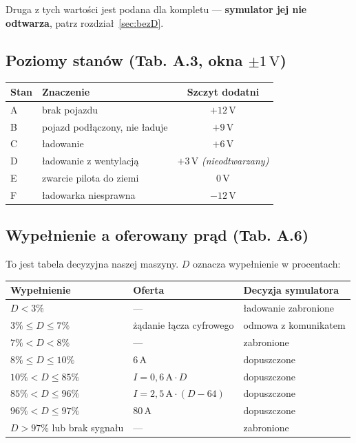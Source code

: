 \documentclass[a4paper,11pt]{article}
\newcommand{\volt}{\,\mathrm{V}}
\newcommand{\amp}{\,\mathrm{A}}
\begin{document}
Druga z tych wartości jest podana dla kompletu --- \textbf{symulator jej nie odtwarza},
patrz rozdział~\ref{sec:bezD}.

\subsection{Poziomy stanów (Tab. A.3, okna \texorpdfstring{$\pm 1\volt$}{+/-1 V})}

\begin{center}
\begin{tabular}{llc}
\toprule
Stan & Znaczenie & Szczyt dodatni \\
\midrule
A & brak pojazdu & $+12\volt$ \\
B & pojazd podłączony, nie ładuje & $+9\volt$ \\
C & ładowanie & $+6\volt$ \\
D & ładowanie z wentylacją & $+3\volt$ \quad \emph{(nieodtwarzany)} \\
E & zwarcie pilota do ziemi & $0\volt$ \\
F & ładowarka niesprawna & $-12\volt$ \\
\bottomrule
\end{tabular}
\end{center}

\subsection{Wypełnienie a oferowany prąd (Tab. A.6)}

To jest tabela decyzyjna naszej maszyny. $D$ oznacza wypełnienie w procentach:

\begin{center}
\begin{tabular}{lll}
\toprule
Wypełnienie & Oferta & Decyzja symulatora \\
\midrule
$D<3\%$              & ---                       & ładowanie zabronione \\
$3\% \le D \le 7\%$  & żądanie łącza cyfrowego   & odmowa z komunikatem \\
$7\% < D < 8\%$      & ---                       & zabronione \\
$8\% \le D \le 10\%$ & $6\amp$                   & dopuszczone \\
$10\% < D \le 85\%$  & $I = 0{,}6\amp \cdot D$   & dopuszczone \\
$85\% < D \le 96\%$  & $I = 2{,}5\amp \cdot (D-64)$ & dopuszczone \\
$96\% < D \le 97\%$  & $80\amp$                  & dopuszczone \\
$D>97\%$ lub brak sygnału & ---                  & zabronione \\
\bottomrule
\end{tabular}
\end{center}
\end{document}
